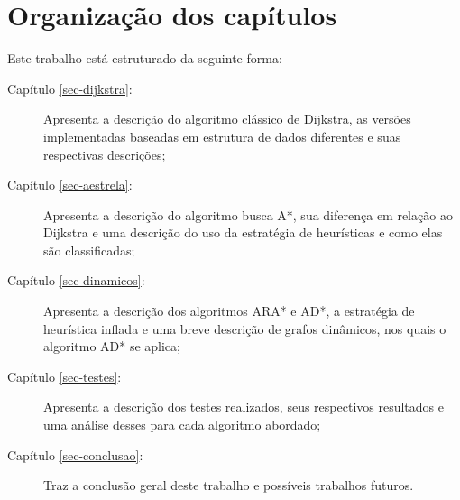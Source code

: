 \section{Organização dos capítulos}
\label{sec-intro-organizaocao}
Este trabalho está estruturado da seguinte forma:
\begin{description}
\item[Capítulo \ref{sec-dijkstra}:] Apresenta a descrição do algoritmo clássico de Dijkstra, as versões implementadas baseadas em estrutura de dados diferentes e suas respectivas descrições;
\item[Capítulo \ref{sec-aestrela}:] Apresenta a descrição do algoritmo busca A*, sua diferença em relação ao Dijkstra e uma descrição do uso da estratégia de heurísticas e como elas são classificadas;
\item[Capítulo \ref{sec-dinamicos}:] Apresenta a descrição dos algoritmos ARA* e AD*, a estratégia de heurística inflada e uma breve descrição de grafos dinâmicos, nos quais o algoritmo AD* se aplica;
\item[Capítulo \ref{sec-testes}:] Apresenta a descrição dos testes realizados, seus respectivos resultados e uma análise desses para cada algoritmo abordado;
\item[Capítulo \ref{sec-conclusao}:] Traz a conclusão geral deste trabalho e possíveis trabalhos futuros.
\end{description}